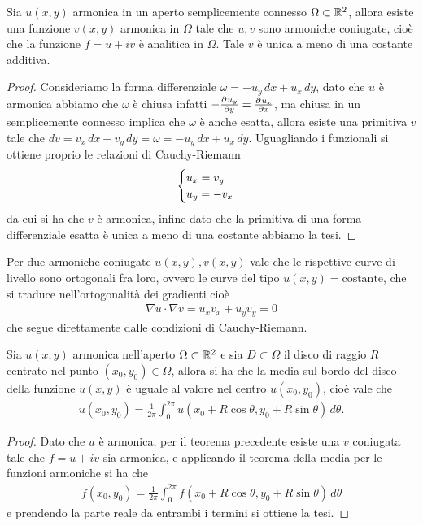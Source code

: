\begin{theorem}
  Sia $ u(x,y) $ armonica in un aperto semplicemente connesso $ \Omega \subset \mathbb{R}^2 $, allora esiste una funzione $ v(x,y) $ 
  armonica in $ \Omega $ tale che $ u,v $ sono armoniche coniugate, cioè che la funzione $ f = u + i v $ è analitica in $ \Omega $. Tale $ v $ è unica a 
  meno di una costante additiva.
\end{theorem}
\begin{proof}
  Consideriamo la forma differenziale $ \omega = -u_y \,dx + u_x \,dy $, dato che $ u $ è armonica abbiamo che $ \omega $ è chiusa infatti 
  $ -\frac{\partial^{} {u_y}}{\partial {y}^{}} = \frac{\partial^{} {u_x}}{\partial {x}^{}} $, ma chiusa in un semplicemente connesso implica che $ \omega $ è anche esatta, allora esiste una primitiva $ v $ tale 
  che $ dv = v_x\,dx + v_y\,dy = \omega = -u_y \,dx + u_x \,dy $. Uguagliando i funzionali si ottiene proprio le relazioni di Cauchy-Riemann 
  \begin{align}
    \begin{cases}
      \displaystyle u_x = v_y
      \\
      \displaystyle u_y = -v_x
    \end{cases}
  \end{align}
  da cui si ha che $ v $ è armonica, infine dato che la primitiva di una forma differenziale esatta è unica a meno di una costante abbiamo la tesi.
\end{proof}

\begin{remark}
  Per due armoniche coniugate $ u(x,y), v(x, y) $ vale che le rispettive curve di livello sono ortogonali fra loro, ovvero le curve del tipo 
  $ u(x,y) = \text{costante} $, che si traduce nell'ortogonalità dei gradienti cioè 
  \begin{align}
    \nabla u \cdot \nabla v = u_x v_x + u_y v_y = 0
  \end{align}
  che segue direttamente dalle condizioni di Cauchy-Riemann.
\end{remark}

\begin{theorem}
  Sia $ u(x,y) $ armonica nell'aperto $ \Omega \subset \mathbb{R}^2 $ e sia $ D \subset \Omega $ 
  il disco di raggio $ R $ centrato nel punto $ (x_0,y_0) \in \Omega $, allora si ha che la media sul bordo del disco della funzione $ u(x,y) $ è uguale 
  al valore nel centro $ u(x_0, y_0) $, cioè vale che 
  \begin{align}
    u(x_0,y_0) = \frac1{2\pi} \int_0^{2\pi} u(x_0 + R\cos \theta, y_0 + R \sin \theta) \, d\theta.
  \end{align}
\end{theorem}
\begin{proof}
  Dato che $ u $ è armonica, per il teorema precedente esiste una $ v $ coniugata tale che $ f = u + i v $ sia armonica, e applicando il teorema 
  della media per le funzioni armoniche si ha che 
  \begin{align}
    f(x_0, y_0) = \frac{1}{2\pi} \int_0^{2\pi} f(x_0 + R \cos \theta , y_0 + R \sin \theta) \, d\theta
  \end{align}
  e prendendo la parte reale da entrambi i termini si ottiene la tesi.
\end{proof}

